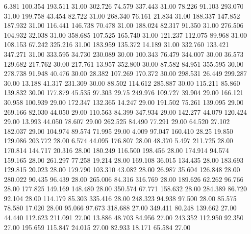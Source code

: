    6.381  100.354  193.511        31.00
 302.726   74.579  337.443        31.00
  78.226   91.103  293.070        31.00
 199.758   43.454   82.722        31.00
 268.340   76.161   21.834        31.00
 188.337  147.852  187.932        31.00
 116.441  146.738   70.478        31.00
 188.024   82.317   91.350        31.00
 276.506  104.932   32.038        31.00
 358.685  107.525  165.740        31.00
 121.237  112.075   89.968        31.00
 108.153   67.242  325.216        31.00
 183.959  135.372   14.189        31.00
 332.760  133.421  347.271        31.00
 333.595   34.730  230.089        30.00
 100.343   76.479  344.007        30.00
  36.573  129.682  217.762        30.00
 217.761   13.957  352.800        30.00
  87.582   84.951  355.595        30.00
 278.738   91.948   40.476        30.00
  28.382  107.269  170.372        30.00
 298.531   26.449  299.287        30.00
  13.188   41.317  231.309        30.00
  88.502  114.612  285.887        30.00
 115.211   85.860  139.832        30.00
 177.879   45.535   97.303        29.75
 249.976  109.727   39.904        29.00
 166.121   30.958  100.939        29.00
 172.347  132.365   14.247        29.00
 191.502   75.261  139.095        29.00
 269.166   82.030   44.050        29.00
 110.563   84.399  347.934        29.00
 142.277   44.079  120.424        29.00
  13.993   44.050   78.607        29.00
 262.525   84.490   77.291        29.00
  64.520   27.102  182.037        29.00
 104.974   89.574   71.995        29.00
   4.009   97.047  160.410        28.25
  19.850  129.086  203.772        28.00
   6.574   44.095  176.807        28.00
  48.370    5.497  211.725        28.00
 170.814  144.717   20.316        28.00
 180.249  116.500  198.456        28.00
 174.914   94.574  159.165        28.00
 261.297   77.258   19.214        28.00
 169.108   36.015  134.435        28.00
 183.693  129.815   20.023        28.00
 179.790  103.310   43.082        28.00
  26.987   35.604  126.848        28.00
 280.022   90.435   96.439        28.00
 265.006   84.316  316.769        28.00
 189.626   62.262   96.766        28.00
 177.825  149.169  148.480        28.00
 350.574   67.771  158.632        28.00
 284.389   86.720   92.104        28.00
 114.179   85.303  335.416        28.00
 248.323   94.938   97.500        28.00
  85.575   78.580   17.020        28.00
  95.066   97.673  318.688        27.00
 349.411   80.248  139.662        27.00
  44.440  112.623  211.091        27.00
  13.886   48.703   84.956        27.00
 243.352  112.950   92.350        27.00
 195.659  115.847   24.015        27.00
  82.933   18.171   65.584        27.00
